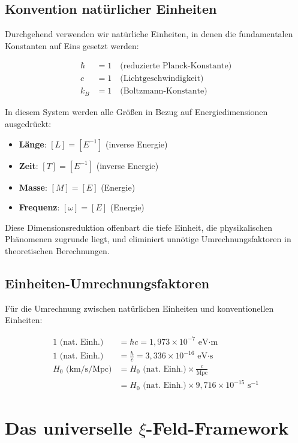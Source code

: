 \documentclass[12pt,a4paper]{article}
\begin{document}
	\subsection{Konvention natürlicher Einheiten}
	
	Durchgehend verwenden wir natürliche Einheiten, in denen die fundamentalen Konstanten auf Eins gesetzt werden:
	
	\begin{align}
		\hbar &= 1 \quad \text{(reduzierte Planck-Konstante)} \\
		c &= 1 \quad \text{(Lichtgeschwindigkeit)} \\
		k_B &= 1 \quad \text{(Boltzmann-Konstante)}
	\end{align}
	
	In diesem System werden alle Größen in Bezug auf Energiedimensionen ausgedrückt:
	\begin{itemize}
		\item \textbf{Länge}: $[L] = [E^{-1}]$ (inverse Energie)
		\item \textbf{Zeit}: $[T] = [E^{-1}]$ (inverse Energie)
		\item \textbf{Masse}: $[M] = [E]$ (Energie)
		\item \textbf{Frequenz}: $[\omega] = [E]$ (Energie)
	\end{itemize}
	
	Diese Dimensionsreduktion offenbart die tiefe Einheit, die physikalischen Phänomenen zugrunde liegt, und eliminiert unnötige Umrechnungsfaktoren in theoretischen Berechnungen.
	
	\subsection{Einheiten-Umrechnungsfaktoren}
	
	Für die Umrechnung zwischen natürlichen Einheiten und konventionellen Einheiten:
	
	\begin{align}
		1 \text{ (nat. Einh.)} &= \hbar c = 1{,}973 \times 10^{-7} \text{ eV·m} \\
		1 \text{ (nat. Einh.)} &= \frac{\hbar}{c} = 3{,}336 \times 10^{-16} \text{ eV·s} \\
		H_0 \text{ (km/s/Mpc)} &= H_0 \text{ (nat. Einh.)} \times \frac{c}{\text{Mpc}} \\
		&= H_0 \text{ (nat. Einh.)} \times 9{,}716 \times 10^{-15} \text{ s}^{-1}
	\end{align}
	
\section{Das universelle $\xi$-Feld-Framework}
\end{document}
